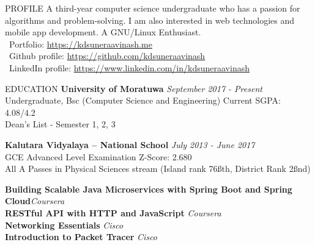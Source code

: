 \documentclass{cv}
\subtitle{344/1, Moonamalgahawatta, Duwa Temple Road, Kalutara South.}  %
\subtitle{(076) 833 6850 \\ \href{mailto:suneraavinash.17@cse.mrt.ac.lk}{suneraavinash.17@cse.mrt.ac.lk}}
\subtitle{\url{https://kdsuneraavinash.me}}
\begin{document}

\begin{rSection}{PROFILE}
    A third-year computer science undergraduate who has a passion for algorithms and problem-solving.
    I am also interested in web technologies and mobile app development.
    A GNU/Linux Enthusiast. \\
    \faGlobe\ Portfolio: \url{https://kdsuneraavinash.me} \\
    \faGithub\ Github profile: \url{https://github.com/kdsuneraavinash} \\
    \faLinkedin\ LinkedIn profile: \url{https://www.linkedin.com/in/kdsuneraavinash}
\end{rSection}

\begin{rSection}{EDUCATION}
    {\bf University of Moratuwa}                                \hfill {\em September 2017 - Present}
    \\ Undergraduate, Bsc (Computer Science and Engineering)    \hfill { Current SGPA: 4.08/4.2 }
    \\ Dean's List - Semester 1, 2, 3 \par

    {\bf Kalutara Vidyalaya – National School}                  \hfill {\em July 2013 - June 2017}
    \\ GCE Advanced Level Examination                           \hfill { Z-Score: 2.680 }
    \\ All A Passes in Physical Sciences stream (Island rank 76\ss{th}, District Rank 2\ss{nd}) \par

    {\bf Building Scalable Java Microservices with Spring Boot and Spring Cloud}\hfill {\em Coursera} \\
    {\bf RESTful API with HTTP and JavaScript}                                  \hfill {\em Coursera} \\
    {\bf Networking Essentials}                                                 \hfill {\em Cisco} \\
    {\bf Introduction to Packet Tracer}                                         \hfill {\em Cisco}
\end{rSection}
\end{document}
